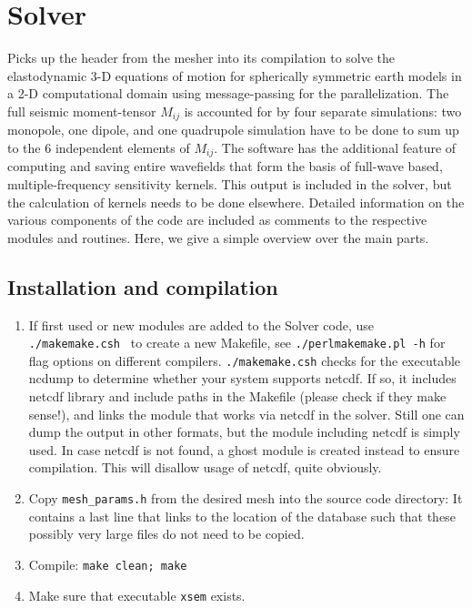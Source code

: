 \documentclass[11pt,letter,fleqn,english,notitlepage]{article}
\begin{document}
\section{Solver}
Picks up the header from the mesher into its compilation to solve 
the elastodynamic 3-D equations of motion for spherically symmetric 
earth models in a 2-D computational domain using message-passing for the 
parallelization. The full seismic moment-tensor $M_{ij}$ is accounted for by four
separate simulations: two monopole, one dipole, and one quadrupole 
simulation have to be done to sum up to the 6 independent elements of $M_{ij}$.
The software has the additional feature of computing and 
saving entire wavefields that form the basis of full-wave based, 
multiple-frequency sensitivity kernels. This output is included in the 
solver, but the calculation of kernels needs to be done elsewhere. 
Detailed information on the various components of the code are included as 
comments to the respective modules and routines. 
Here, we give a simple overview over the main parts. 
\newpage
\subsection{Installation and compilation}
\begin{enumerate}
\item If first used or new modules are added to the Solver code,
use {\tt ./makemake.csh } to create a new Makefile, see {\tt ./perlmakemake.pl -h} for 
flag options on different compilers. {\tt ./makemake.csh} checks for the
executable ncdump to determine whether your system supports netcdf. If
so, it includes netcdf library and include paths in the Makefile
(please check if they make sense!), and links the module that works
via netcdf in the solver. Still one can dump the output in other
formats, but the module including netcdf is simply used. In case
netcdf is not found, a ghost module is created instead to ensure
compilation. This will disallow usage of netcdf, quite obviously.
\item Copy {\tt mesh\_params.h} from the desired mesh into the source code directory: 
It contains a last line that links to the location of the database such that 
these possibly very large files do not need to be copied. 
\item Compile: {\tt make clean; make}
\item Make sure that executable {\tt xsem} exists.
\end{enumerate}

\end{document}
